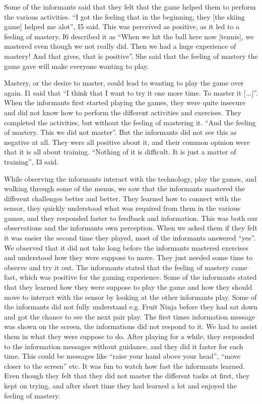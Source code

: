 Some of the informants said that they felt that the game helped them to perform the various activities. “I got the feeling that in the beginning, they [the skiing game] helped me alot”, I5 said. This was perceived as positive, as it led to a feeling of mastery. I6 described it as “When we hit the ball here now [tennis], we mastered even though we not really did. Then we had a huge experience of mastery! And that gives, that is positive”. She said that the feeling of mastery the game gave will make everyone wanting to play.  

Mastery, or the desire to master, could lead to wanting to play the game over again. I1 said that “I think that I want to try it one more time. To master it [...]”. When the informants first started playing the games, they were quite insecure and did not know how to perform the different activities and exercises. They completed the activities, but without the feeling of mastering it. “And the feeling of mastery. This we did not master”. But the informants did not see this as negative at all. They were all positive about it, and their common opinion were that it is all about training. “Nothing of it is difficult. It is just a matter of training”, I3 said. 

While observing the informants interact with the technology, play the games, and walking through some of the menus, we saw that the informants mastered the different challenges better and better. They learned how to connect with the sensor, they quickly understood what was required from them in the various games, and they responded faster to feedback and information. This was both our observations and the informants own perception. When we asked them if they felt it was easier the second time they played, most of the informants answered “yes”. We observed that it did not take long before the informants mastered exercises and understood how they were suppose to move. They just needed some time to observe and try it out. The informants stated that the feeling of mastery came fast, which was positive for the gaming experience. Some of the informants stated that they learned how they were suppose to play the game and how they should move to interact with the sensor by looking at the other informants play. Some of the informants did not fully understand e.g. Fruit Ninja before they had sat down and got the chance to see the next pair play. The first times information message was shown on the screen, the informations did not respond to it. We had to assist them in what they were suppose to do. After playing for a while, they responded to the information messages without guidance, and they did it faster for each time. This could be messages like “raise your hand above your head”, “move closer to the screen” etc. It was fun to watch how fast the informants learned. Even though they felt that they did not master the different tasks at first, they kept on trying, and after short time they had learned a lot and enjoyed the feeling of mastery. 


